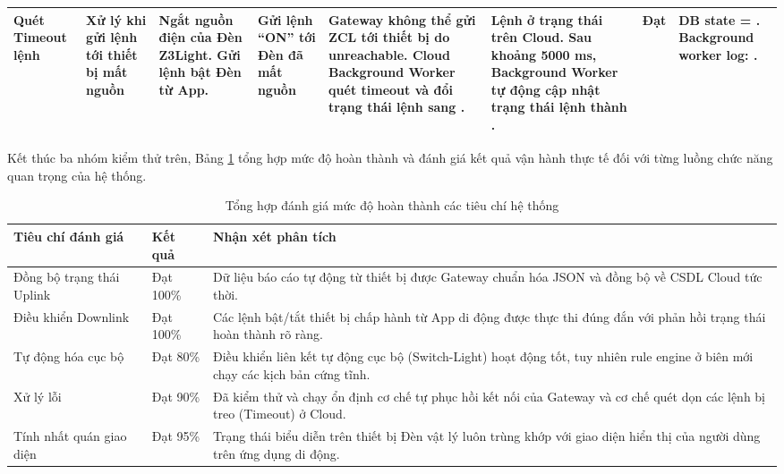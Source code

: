 \begin{table}[H]
\begin{tabular}{|P{1.7cm}|P{1.8cm}|P{2.4cm}|P{1.4cm}|P{2.05cm}|P{2.05cm}|P{0.6cm}|P{2.35cm}|}
\hline
Quét Timeout lệnh & Xử lý khi gửi lệnh tới thiết bị mất nguồn & Ngắt nguồn điện của Đèn Z3Light. Gửi lệnh bật Đèn từ App. & Gửi lệnh ``ON'' tới Đèn đã mất nguồn & Gateway không thể gửi ZCL tới thiết bị do unreachable. Cloud Background Worker quét timeout và đổi trạng thái lệnh sang . & Lệnh ở trạng thái  trên Cloud. Sau khoảng 5000 ms, Background Worker tự động cập nhật trạng thái lệnh thành . & Đạt & DB state = . Background worker log: . \\
\hline
\end{tabular}
\normalsize
\renewcommand{\arraystretch}{1.0}
\end{table}

Kết thúc ba nhóm kiểm thử trên, Bảng \ref{tab:ch5-eval-summary} tổng hợp mức độ hoàn thành và đánh giá kết quả vận hành thực tế đối với từng luồng chức năng quan trọng của hệ thống.

\begin{table}[H]
\centering
\caption{Tổng hợp đánh giá mức độ hoàn thành các tiêu chí hệ thống}
\label{tab:ch5-eval-summary}
\begin{tabular}{|>{\raggedright\arraybackslash}p{4.2cm}|>{\raggedright\arraybackslash}p{2.0cm}|>{\raggedright\arraybackslash}p{7.5cm}|}
\hline
\textbf{Tiêu chí đánh giá} & \textbf{Kết quả} & \textbf{Nhận xét phân tích} \\ \hline
Đồng bộ trạng thái Uplink & Đạt 100\% & Dữ liệu báo cáo tự động từ thiết bị được Gateway chuẩn hóa JSON và đồng bộ về CSDL Cloud tức thời. \\ \hline
Điều khiển Downlink & Đạt 100\% & Các lệnh bật/tắt thiết bị chấp hành từ App di động được thực thi đúng đắn với phản hồi trạng thái hoàn thành rõ ràng. \\ \hline
Tự động hóa cục bộ & Đạt 80\% & Điều khiển liên kết tự động cục bộ (Switch-Light) hoạt động tốt, tuy nhiên rule engine ở biên mới chạy các kịch bản cứng tĩnh. \\ \hline
Xử lý lỗi & Đạt 90\% & Đã kiểm thử và chạy ổn định cơ chế tự phục hồi kết nối của Gateway và cơ chế quét dọn các lệnh bị treo (Timeout) ở Cloud. \\ \hline
Tính nhất quán giao diện & Đạt 95\% & Trạng thái biểu diễn trên thiết bị Đèn vật lý luôn trùng khớp với giao diện hiển thị của người dùng trên ứng dụng di động. \\ \hline
\end{tabular}
\end{table}

